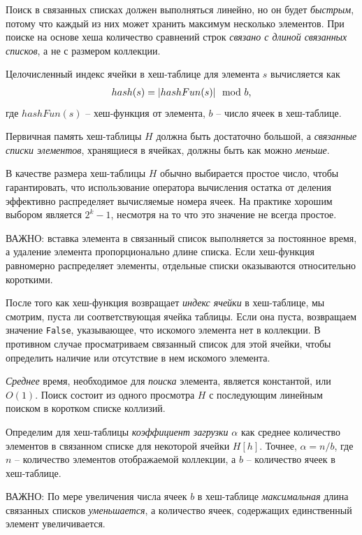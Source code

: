 \documentclass[%
	11pt,
	a4paper,
	utf8,
		]{article}
\begin{document}
Поиск в связанных списках должен выполняться линейно, но он будет \emph{быстрым}, потому что каждый из них может хранить максимум несколько элементов. При поиске на основе хеша количество сравнений строк \emph{связано с длиной связанных списков}, а не с размером коллекции.

Целочисленный индекс ячейки в хеш-таблице для элемента $ s $ вычисляется как
\begin{align*}
	hash(s) = \lvert hashFun(s)\rvert \mod b,
\end{align*}
где $ hashFun(s) $ -- хеш-функция от элемента, $ b $ -- число ячеек в хеш-таблице.

Первичная память хеш-таблицы $ H $ должна быть достаточно большой, а \emph{связанные списки элементов}, хранящиеся в ячейках, должны быть как можно \emph{меньше}.

В качестве размера хеш-таблицы $ H $ обычно выбирается простое число, чтобы гарантировать, что использование оператора вычисления остатка от деления эффективно распределяет вычисляемые номера ячеек. На практике хорошим выбором является $ 2^k - 1 $, несмотря на то что это значение не всегда простое.

ВАЖНО: вставка элемента в связанный список выполняется за постоянное время, а удаление элемента пропорционально длине списка. Если хеш-функция равномерно распределяет элементы, отдельные списки оказываются относительно короткими.

После того как хеш-функция возвращает \emph{индекс ячейки} в хеш-таблице, мы смотрим, пуста ли соответствующая ячейка таблицы. Если она пуста, возвращаем значение \texttt{False}, указывающее, что искомого элемента нет в коллекции. В противном случае просматриваем связанный список для этой ячейки, чтобы определить наличие или отсутствие в нем искомого элемента.

\emph{Среднее} время, необходимое для \emph{поиска} элемента, является константой, или $ O(1) $. Поиск состоит из одного просмотра $ H $ с последующим линейным поиском в коротком списке коллизий.

Определим для хеш-таблицы \emph{коэффициент загрузки} $ \alpha $ как среднее количество элементов в связанном списке для некоторой ячейки $ H[h] $. Точнее, $ \alpha = n/b $, где $ n $ -- количество элементов отображаемой коллекции, а $ b $ -- количество ячеек в хеш-таблице.

ВАЖНО: По мере увеличения числа ячеек $ b $ в хеш-таблице \emph{максимальная} длина связанных списков \emph{уменьшается}, а количество ячеек, содержащих единственный элемент увеличивается.
\end{document}
